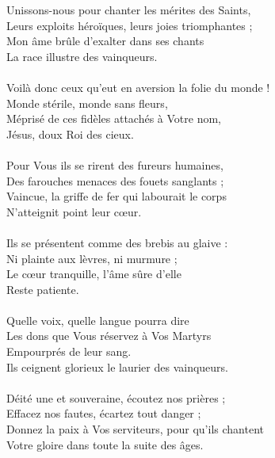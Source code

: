Unissons-nous pour chanter les mérites des Saints,\\
Leurs exploits héroïques, leurs joies triomphantes ;\\
Mon âme brûle d'exalter dans ses chants\\
La race illustre des vainqueurs.\\
\\
Voilà donc ceux qu'eut en aversion la folie du monde !\\
Monde stérile, monde sans fleurs,\\
Méprisé de ces fidèles attachés à Votre nom,\\
Jésus, doux Roi des cieux.\\
\\
Pour Vous ils se rirent des fureurs humaines,\\
Des farouches menaces des fouets sanglants ;\\
Vaincue, la griffe de fer qui labourait le corps\\
N'atteignit point leur cœur.\\
\\
Ils se présentent comme des brebis au glaive :\\
Ni plainte aux lèvres, ni murmure ;\\
Le cœur tranquille, l'âme sûre d'elle\\
Reste patiente.\\
\\
Quelle voix, quelle langue pourra dire\\
Les dons que Vous réservez à Vos Martyrs\\
Empourprés de leur sang.\\
Ils ceignent glorieux le laurier des vainqueurs.\\
\\
Déité une et souveraine, écoutez nos prières ;\\
Effacez nos fautes, écartez tout danger ;\\
Donnez la paix à Vos serviteurs, pour qu'ils chantent\\
Votre gloire dans toute la suite des âges.
